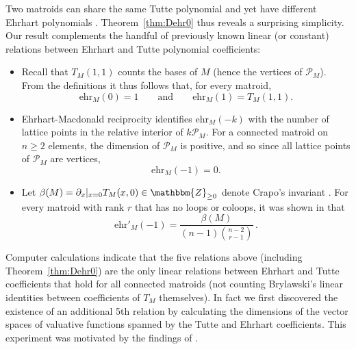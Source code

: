 \documentclass[pagesize,paper=A4,11pt,bibliography=totoc,oneside]{scrartcl}
\newcommand{\ZZ}{\mathbbm{Z}}
\newcommand{\MP}[1]{\mathscr{P}_{#1}} %
\newcommand{\ehr}{\mathrm{ehr}}
\newcommand{\Tutte}{T}
\begin{document}
Two matroids can share the same Tutte polynomial and yet have different Ehrhart polynomials \cite[\S3]{DeLoeraHawsKoeppe:Ehrhart}. %
Theorem~\ref{thm:Dehr0} thus reveals a surprising simplicity. %
Our result complements the handful of previously known linear (or constant) relations between Ehrhart and Tutte polynomial coefficients:
\begin{itemize}
    \item Recall that $\Tutte_M(1,1)$ counts the bases of $M$ (hence the vertices of $\MP{M}$). From the definitions it thus follows that, for every matroid,
\begin{equation*}
    \ehr_M(0) = 1 \qquad\text{and}\qquad
    \ehr_M(1) = \Tutte_M(1,1).
\end{equation*}
    \item Ehrhart-Macdonald reciprocity \cite{Breuer:InvitationEhrhart} identifies $\ehr_M(-k)$ with the number of lattice points in the relative interior of $k\MP{M}$. For a connected matroid on $n\geq2$ elements, the dimension of $\MP{M}$ is positive, and so since all lattice points of $\MP{M}$ are vertices,
\begin{equation*}
    \ehr_M(-1) = 0.
\end{equation*}
\item Let $\beta(M)=\partial_x|_{x=0} \Tutte_M(x,0)\in \ZZ_{\geq 0}$ denote Crapo's invariant \cite{Crapo:HigherInvariant}. For every matroid with rank $r$ that has no loops or coloops, it was shown in \cite{CDBFLRVM:EhrhartBeta} that
\begin{equation*}
    \ehr'_M(-1) = \frac{\beta(M)}{(n-1)\binom{n-2}{r-1}} \,.
\end{equation*}
\end{itemize}
Computer calculations indicate that the five relations above (including Theorem~\ref{thm:Dehr0}) are the only linear relations between Ehrhart and Tutte coefficients that hold for all connected matroids (not counting Brylawski's linear identities \cite{BekeCsajiCsikvariPituk:ShortByrlawski} between coefficients of $\Tutte_M$ themselves). %
In fact we first discovered the existence of an additional 5th relation by calculating the dimensions of the vector spaces of valuative functions spanned by the Tutte and Ehrhart coefficients. This experiment was motivated by the findings of \cite{CDBFLRVM:EhrhartBeta}.
\end{document}
